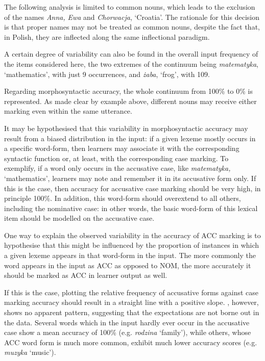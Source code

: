 The following analysis is limited to common nouns, which leads to the exclusion of the names \textit{Anna,} \textit{Ewa} and \textit{Chorwacja}, ‘Croatia’. The rationale for this decision is that proper names may not be treated as common nouns, despite the fact that, in Polish, they are inflected  along the same inflectional paradigm. 

A certain degree of variability can also be found in the overall input frequency of the items considered here, the two extremes of the continuum being \textit{matematyka}, ‘mathematics’, with just 9 occurrences, and \textit{żaba}, ‘frog’, with 109. 

Regarding morphosyntactic accuracy, the whole continuum from 100\% to 0\% is represented. As made clear by example  above, different nouns may receive either marking even within the same utterance. 

It may be hypothesised that this variability in morphosyntactic accuracy may result from a biased distribution in the input: if a given lexeme mostly occurs in a specific word-form, then learners may associate it with the corresponding syntactic function or, at least, with the corresponding case marking. To exemplify, if a word only occurs in the accusative case, like \textit{matematyka,} ‘mathematics’, learners may note and remember it in its accusative form only. If this is the case, then accuracy for accusative case marking should be very high, in principle 100\%. In addition, this word-form should overextend to all others, including the nominative case: in other words, the basic word-form of this lexical item should be modelled on the accusative case.

One way to explain the observed variability in the accuracy of ACC marking is to hypothesise that this might be influenced by the proportion of instances in which a given lexeme appears in that word-form in the input. The more commonly the word appears in the input as ACC as opposed to NOM, the more accurately it should be marked as ACC in learner output as well.

If this is the case, plotting the relative frequency of accusative forms against case marking accuracy should result in a straight line with a positive slope. , however, shows no apparent pattern, suggesting that the expectations are not borne out in the data. Several words which in the input hardly ever occur in the accusative case show a mean accuracy of 100\% (e.g. \textit{rodzina} ‘family’), while others, whose ACC word form is much more common, exhibit much lower accuracy scores (e.g. \textit{muzyka} ‘music’).

